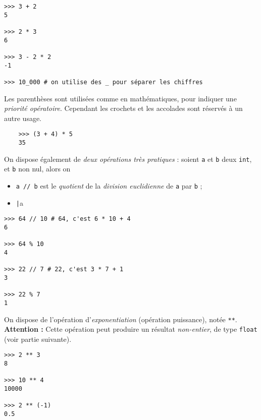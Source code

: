 \begin{pyc}\begin{verbatim}
>>> 3 + 2
5

>>> 2 * 3
6

>>> 3 - 2 * 2
-1

>>> 10_000 # on utilise des _ pour séparer les chiffres
\end{verbatim}
\end{pyc}

Les parenthèses sont utilisées comme en mathématiques, pour indiquer une \textit{priorité opératoire}. Cependant les crochets et les accolades sont réservés à un autre usage.

\begin{pyc}
  \begin{verbatim}
    >>> (3 + 4) * 5
    35
  \end{verbatim}
\end{pyc}

On dispose également de \textit{deux opérations très pratiques} : soient \texttt{a} et \texttt{b} deux \texttt{int}, et \texttt{b} non nul, alors on
\begin{itemize}
  \item \texttt{a // b} est le \textit{quotient} de la \textit{division euclidienne} de \texttt{a} par \texttt{b} ;
  \item \texttt|a %
\end{itemize}


\begin{pyc}\begin{verbatim}
>>> 64 // 10 # 64, c'est 6 * 10 + 4
6

>>> 64 % 10
4

>>> 22 // 7 # 22, c'est 3 * 7 + 1
3

>>> 22 % 7
1
\end{verbatim}
\end{pyc}


On dispose de l'opération d'\textit{exponentiation} (opération puissance), notée \texttt{**}.\\
\textbf{Attention :} Cette opération peut produire un résultat \textit{non-entier}, de type \texttt{float} (voir partie suivante).

\begin{pyc}\begin{verbatim}
>>> 2 ** 3
8

>>> 10 ** 4
10000

>>> 2 ** (-1)
0.5
\end{verbatim}
\end{pyc}

